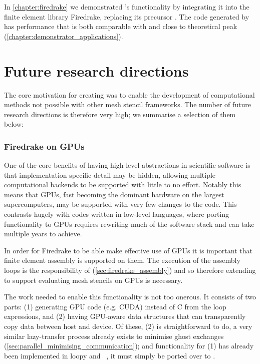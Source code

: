\documentclass[thesis]{subfiles}
\begin{document}
In \cref{chapter:firedrake} we demonstrated 's functionality by integrating it into the finite element library Firedrake, replacing its precursor .
The code generated by  has performance that is both comparable with  and close to theoretical peak (\cref{chapter:demonstrator_applications}).

\section{Future research directions}
\label{sec:future_work}

The core motivation for creating  was to enable the development of computational methods not possible with other mesh stencil frameworks.
The number of future research directions is therefore very high; we summarise a selection of them below:

\subsubsection{Firedrake on GPUs}

One of the core benefits of having high-level abstractions in scientific software is that implementation-specific detail may be hidden, allowing multiple computational backends to be supported with little to no effort.
Notably this means that GPUs, fast becoming the dominant hardware on the largest supercomputers, may be supported with very few changes to the code.
This contrasts hugely with codes written in low-level languages, where porting functionality to GPUs requires rewriting much of the software stack and can take multiple years to achieve.

In order for Firedrake to be able make effective use of GPUs it is important that finite element assembly is supported on them.
The execution of the assembly loops is the responsibility of  (\cref{sec:firedrake_assembly}) and so therefore extending  to support evaluating mesh stencils on GPUs is necessary.

The work needed to enable this functionality is not too onerous.
It consists of two parts:
(1) generating GPU code (e.g. CUDA) instead of C from the loop expressions, and
(2) having GPU-aware data structures that can transparently copy data between host and device.
Of these, (2) is straightforward to do, a very similar lazy-transfer process already exists to minimise ghost exchanges (\cref{sec:parallel_minimising_communication}); and functionality for (1) has already been implemented in loopy and ~\cite{fenics2021-kulkarni}, it must simply be ported over to .
\end{document}
